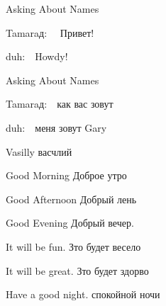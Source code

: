 \documentclass[avery5371,grid,frame]{flashcards}
\newcommand{\inR}[1]{\foreignlanguage{russian}{#1}}
\newcommand{\speakR}[1]{\item \foreignlanguage{russian}{#1}:\ \ }
\newcommand{\speakE}[1]{\item \foreignlanguage{english}{#1}:\ \ }
\newcommand{\aDlog}[1]{
  \begin{list}{\quad}{}
#1
  \end{list}}
\begin{document}
\newcommand{\theBack}[1]{
{\large
  \begin{center}
\vspace*{\fill}
#1
\vspace*{\fill}
  \end{center}
}}


\begin{flashcard}[]{Asking About Names}
\theBack{
\aDlog{
    \speakR{\inR{Tamaraд}} \inR{Привет!}
    \speakE{\inR{duh}}Howdy!
}}
\end{flashcard}


\begin{flashcard}[]{Asking About Names}
  \smallskip
\aDlog{
    \speakR{\inR{Tamaraд}}\inR{как вас зовут}
    \speakE{\inR{duh}}\inR{меня зовут Gary}
}
\end{flashcard}


\begin{flashcard}[Names]{Vasilly}
  \inR{васчлий}
\end{flashcard}


\begin{flashcard}[Greetings]{Good Morning}
  \smallskip
\inR{Доброе утро}
\end{flashcard}

\begin{flashcard}[Greetings]{Good Afternoon}
  \smallskip
\inR{Добрый лень}
\end{flashcard}

\begin{flashcard}[Greetings]{Good Evening}
  \smallskip
\inR{Добрый вечер.}
\end{flashcard}



\begin{flashcard}[Greetings]{It will be fun.}
  \smallskip
\inR{Зто будет весело}
\end{flashcard}



\begin{flashcard}[Greetings]{It will be great.}
  \smallskip
\inR{Зто будет здорво}
\end{flashcard}


\begin{flashcard}[Greetings]{Have a good night.}
  \smallskip
\inR{спокойной ночи}
\end{flashcard}
\end{document}
